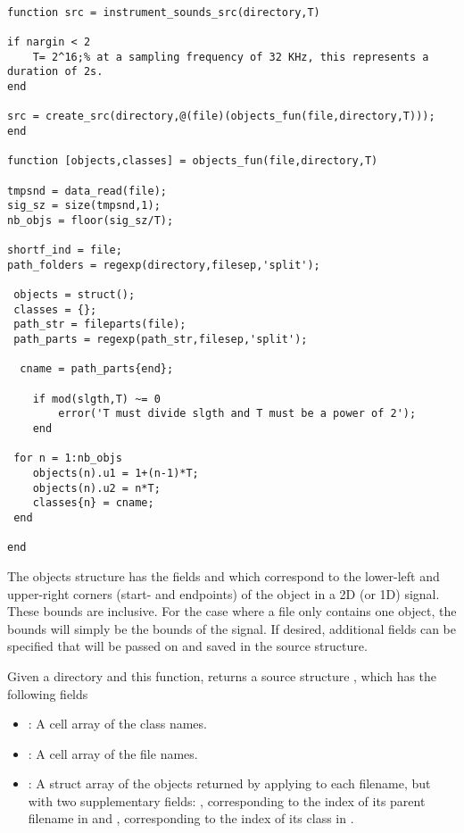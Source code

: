 \documentclass{article}
\begin{document}
\begin{lstlisting}

function src = instrument_sounds_src(directory,T)

if nargin < 2
    T= 2^16;% at a sampling frequency of 32 KHz, this represents a duration of 2s. 
end

src = create_src(directory,@(file)(objects_fun(file,directory,T)));
end

function [objects,classes] = objects_fun(file,directory,T)

tmpsnd = data_read(file);
sig_sz = size(tmpsnd,1);
nb_objs = floor(sig_sz/T);

shortf_ind = file;
path_folders = regexp(directory,filesep,'split');

 objects = struct();
 classes = {};
 path_str = fileparts(file);
 path_parts = regexp(path_str,filesep,'split');
    
  cname = path_parts{end};
   
    if mod(slgth,T) ~= 0
        error('T must divide slgth and T must be a power of 2');
    end
     
 for n = 1:nb_objs
    objects(n).u1 = 1+(n-1)*T;
    objects(n).u2 = n*T;
    classes{n} = cname;
 end

end

\end{lstlisting}

The objects structure has the fields  and  which correspond to the lower-left and upper-right corners (start- and endpoints) of the object in a 2D (or 1D) signal. These bounds are inclusive. For the case where a file only contains one object, the bounds will simply be the bounds of the signal. If desired, additional fields can be specified that will be passed on and saved in the source structure.

Given a directory and this function,  returns a source structure , which has the following fields
\begin{itemize}
	\item {}: A cell array of the class names.
	\item {}: A cell array of the file names.
	\item {}: A struct array of the objects returned by applying  to each filename, but with two supplementary fields: , corresponding to the index of its parent filename in  and , corresponding to the index of its class in .
\end{itemize}
\end{document}
